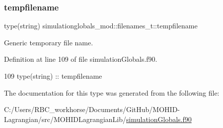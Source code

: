 \subsubsection{\texorpdfstring{tempfilename}{tempfilename}}
{\footnotesize\ttfamily type(string) simulationglobals\+\_\+mod\+::filenames\+\_\+t\+::tempfilename\hspace{0.3cm}{\ttfamily [private]}}



Generic temporary file name. 



Definition at line 109 of file simulation\+Globals.\+f90.


\begin{DoxyCode}
109         \textcolor{keywordtype}{type}(string) :: tempfilename
\end{DoxyCode}


The documentation for this type was generated from the following file\+:\begin{DoxyCompactItemize}
\item 
C\+:/\+Users/\+R\+B\+C\+\_\+workhorse/\+Documents/\+Git\+Hub/\+M\+O\+H\+I\+D-\/\+Lagrangian/src/\+M\+O\+H\+I\+D\+Lagrangian\+Lib/\mbox{\hyperlink{simulation_globals_8f90}{simulation\+Globals.\+f90}}\end{DoxyCompactItemize}
